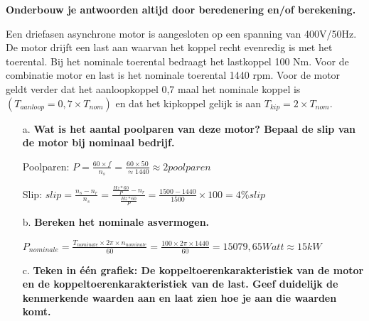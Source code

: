 \textbf{Onderbouw je antwoorden altijd door beredenering en/of berekening.}

Een driefasen asynchrone motor is aangesloten op een spanning van 400V/50Hz.
De motor drijft een last aan waarvan het koppel recht evenredig is met het toerental.
Bij het nominale toerental bedraagt het lastkoppel 100 Nm.
Voor de combinatie motor en last is het nominale toerental 1440 rpm.
Voor de motor geldt verder dat het aanloopkoppel 0,7 maal het nominale koppel is
$(T_{aanloop} = 0,7 \times T_{nom})$ en dat het kipkoppel gelijk is aan $T_{kip} = 2 \times T_{nom}$.

\begin{enumerate}
    \item [a.] \textbf{Wat is het aantal poolparen van deze motor? Bepaal de slip van de motor bij nominaal bedrijf.}
    
        Poolparen:
        $ P = \frac{60 \times f}{n_{s}} = \frac{60 \times 50}{\approx1440} \approx 2 poolparen $

        Slip:
        $slip 
        = \frac{n_{s} - n_{r}}{n_{s}} 
        = \frac{\frac{Hz*60}{P} - n_{r}}{\frac{Hz*60}{P}}
        = \frac{1500 - 1440}{1500} \times 100 
        = 4\% slip$

    \item [b.] \textbf{Bereken het nominale asvermogen.}

    $P_{nominale} 
    = \frac{T_{nominale} \times 2\pi \times n_{nominale}}{60}= \frac{100 \times 2\pi \times 1440}{60} 
    = 15079,65 Watt \approx 15 kW$


    \item [c.] \textbf{Teken in één grafiek: De koppeltoerenkarakteristiek van de motor en de koppeltoerenkarakteristiek van de last. Geef duidelijk de kenmerkende waarden aan en laat zien hoe je aan die waarden komt.}


\end{enumerate}
